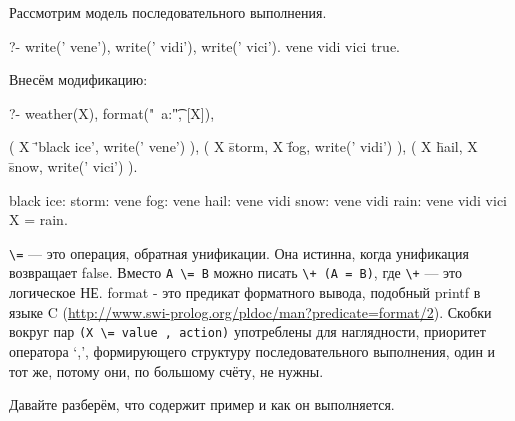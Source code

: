 \documentclass[a4paper]{book}
\begin{document}
Рассмотрим модель последовательного выполнения.

\begin{example}{}{}
?- write(' vene'), write(' vidi'), write(' vici').
 vene vidi vici
true.
\end{example}

Внесём модификацию:

\begin{example}{}{}
?- weather(X), format("\n~a:\t", [X]), 

   ( X \= 'black ice',     write(' vene') ), 
   ( X \= storm, X \= fog, write(' vidi') ), 
   ( X \= hail, X \= snow, write(' vici') ).

black ice:      
storm:   vene
fog:     vene
hail:    vene vidi
snow:    vene vidi
rain:    vene vidi vici
X = rain.
\end{example}

\verb|\=| --- это операция, обратная унификации. Она истинна,
когда унификация возвращает false. Вместо \verb|A \= B| можно
писать \verb|\+ (A = B)|, где \verb|\+| --- это логическое
НЕ. format - это предикат форматного вывода, подобный printf в
языке C
(\url{http://www.swi-prolog.org/pldoc/man?predicate=format/2}).
Скобки вокруг пар \verb|(X \= value , action)| употреблены для
наглядности, приоритет оператора `,', формирующего структуру
последовательного выполнения, один и тот же, потому они, по
большому счёту, не нужны.

Давайте разберём, что содержит пример и как он выполняется.
\end{document}
